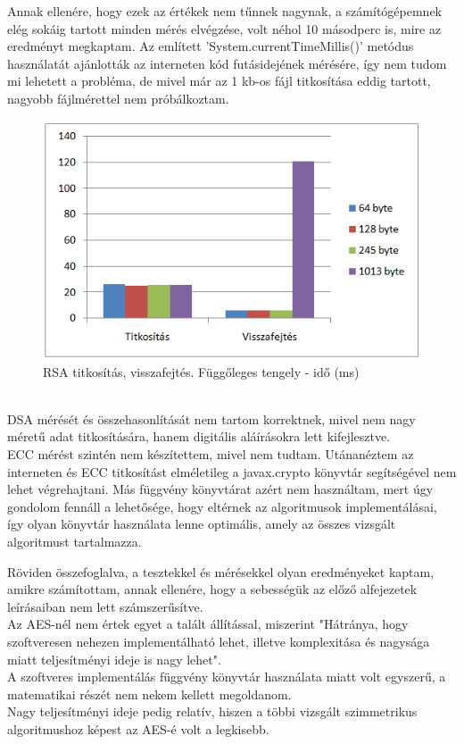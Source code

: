 \noindent Annak ellenére, hogy ezek az értékek nem  tűnnek nagynak, a számítógépemnek elég sokáig tartott minden mérés elvégzése, volt néhol 10 másodperc is, mire az eredményt megkaptam. Az említett ’System.currentTimeMillis()’ metódus használatát ajánlották az interneten kód futásidejének mérésére, így nem tudom mi lehetett a probléma, de mivel már az 1 kb-os fájl titkosítása eddig tartott, nagyobb fájlmérettel nem próbálkoztam.
\begin{figure}[h]
	\centering
	\includegraphics[scale=0.8]{images/alg_graf_4.png}
	\caption{RSA titkosítás, visszafejtés. Függőleges tengely - idő (ms)}
	\label{fig:rsa_graf}
\end{figure}
\\ \noindent DSA mérését és összehasonlítását nem tartom korrektnek, mivel nem nagy méretű adat titkosítására, hanem digitális aláírásokra lett kifejlesztve.
\\ECC mérést szintén nem készítettem, mivel nem tudtam. Utánanéztem az interneten és ECC titkosítást elméletileg a javax.crypto könyvtár segítségével nem lehet végrehajtani. Más függvény könyvtárat azért nem használtam, mert úgy gondolom fennáll a lehetősége, hogy eltérnek az algoritmusok implementálásai, így olyan könyvtár használata lenne optimális, amely az összes vizsgált algoritmust tartalmazza.



\vspace{15pt}\noindent Röviden összefoglalva, a tesztekkel és mérésekkel olyan eredményeket kaptam, amikre számítottam, annak ellenére, hogy a sebességük az előző alfejezetek leírásaiban nem lett számszerűsítve. 
\\Az AES-nél nem értek egyet a talált állítással, miszerint "Hátránya, hogy szoftveresen nehezen implementálható lehet, illetve komplexitása és nagysága miatt teljesítményi ideje is nagy lehet".
\\A szoftveres implementálás függvény könyvtár használata miatt volt egyszerű, a matematikai részét nem nekem kellett megoldanom.
\\Nagy teljesítményi ideje pedig relatív, hiszen a többi vizsgált szimmetrikus algoritmushoz képest az AES-é volt a legkisebb.
